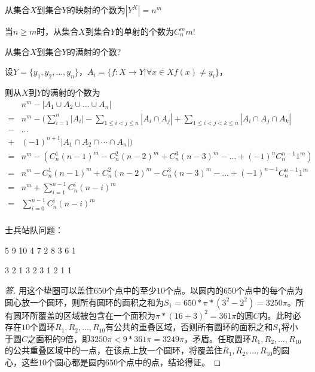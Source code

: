 \documentclass{article}
\begin{document}
\begin{CJK*}{UTF8}{gbsn}
从集合$X$到集合$Y$的映射的个数为$|Y^X|=n^m$

当$n\geq m$时，从集合$X$到集合$Y$的单射的个数为$C_n^mm!$

从集合$X$到集合$Y$的满射的个数?

设$Y=\{y_1,y_2,\ldots, y_n\}$，$A_i=\{f:X\to Y| \forall x \in X f(x) \neq y_i\}$，

则从$X$到$Y$的满射的个数为
\begin{equation*}
  \begin{split}
&n^m - |A_1 \cup A_2 \cup \ldots \cup A_n|\\
=&n^m - (\sum_{i=1}^n|A_i| - \sum_{1\leq i < j \leq n}|A_i \cap A_j| + \sum_{1 \leq  i < j < k \leq n}|A_i \cap A_j \cap A_k|\\
-&\ldots\\
+&(-1)^{n+1}|A_1 \cap A_2 \cap \cdots \cap A_n|)\\
=&n^m - (C_n^1(n-1)^m - C_n^2(n-2)^m + C_n^3(n-3)^m - \ldots + (-1)^nC_n^{n-1}1^m)\\
=&n^m - C_n^1(n-1)^m + C_n^2(n-2)^m - C_n^3(n-3)^m - \ldots + (-1)^{n-1}C_n^{n-1}1^m\\
=&n^m + \sum_{i=1}^{n-1}C_n^i(n-i)^m\\
=&\sum_{i=0}^{n-1}C_n^i(n-i)^m\\
\end{split}
\end{equation*}
 



士兵站队问题：

5 9 10 4 7 2 8 3 6 1

3 2 1  3 2 3 1 2 1 1

\begin{proof}[答]
  用这个垫圈可以盖住$650$个点中的至少$10$个点。以圆内的650个点中的每个点为圆心放一个圆环，则所有圆环的面积之和为$S_1 = 650 * \pi * (3^2 - 2^2) = 3250\pi$。所有圆环所覆盖的区域被包含在一个面积为$\pi * (16 + 3)^2= 361\pi$的圆$C$内。此时必存在$10$个圆环$R_1,R_2,\ldots, R_{10}$有公共的重叠区域，否则所有圆环的面积之和$S_1$将小于圆$C$之面积的$9$倍，即$3250\pi < 9 * 361\pi = 3249\pi$，矛盾。任取圆环$R_1,R_2,\ldots, R_{10}$的公共重叠区域中的一点，在该点上放一个圆环，将覆盖住$R_1,R_2,\ldots,R_{10}$的圆心，这些$10$个圆心都是圆内$650$个点中的点，结论得证。 
\end{proof}


\clearpage

\end{CJK*}
\end{document}
